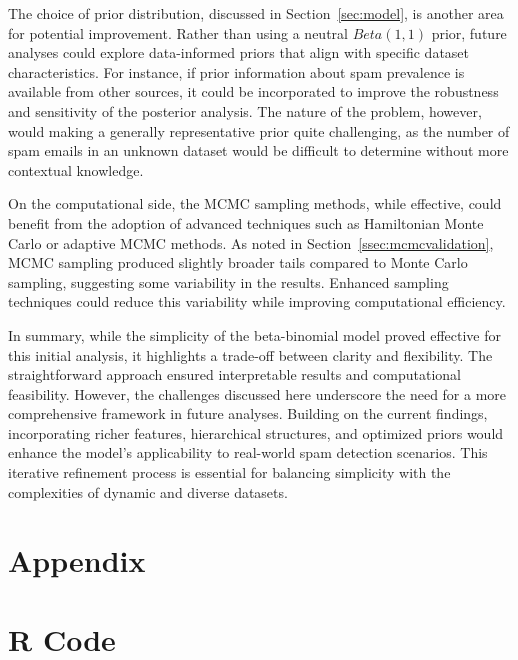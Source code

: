 \documentclass[12pt,a4paper]{article}
\begin{document}
The choice of prior distribution, discussed in Section~\ref{sec:model}, is another area for potential
improvement. Rather than using a neutral $Beta(1,1)$ prior, future analyses could explore data-informed
priors that align with specific dataset characteristics. For instance, if prior information about spam
prevalence is available from other sources, it could be incorporated to improve the robustness and
sensitivity of the posterior analysis. The nature of the problem, however, would making a generally
representative prior quite challenging, as the number of spam emails in an unknown dataset would be
difficult to determine without more contextual knowledge. 

On the computational side, the MCMC sampling methods, while effective, could benefit from the adoption
of advanced techniques such as Hamiltonian Monte Carlo or adaptive MCMC methods. As noted in
Section~\ref{ssec:mcmcvalidation}, MCMC sampling produced slightly broader tails compared to Monte Carlo
sampling, suggesting some variability in the results. Enhanced sampling techniques could reduce this
variability while improving computational efficiency.

In summary, while the simplicity of the beta-binomial model proved effective for this initial analysis, it
highlights a trade-off between clarity and flexibility. The straightforward approach ensured interpretable
results and computational feasibility. However, the challenges discussed here underscore the need for a more
comprehensive framework in future analyses. Building on the current findings, incorporating richer features,
hierarchical structures, and optimized priors would enhance the model's applicability to real-world spam
detection scenarios. This iterative refinement process is essential for balancing simplicity with the
complexities of dynamic and diverse datasets.

\newpage
\section{Appendix}
\appendix
\section{R Code}

\end{document}
